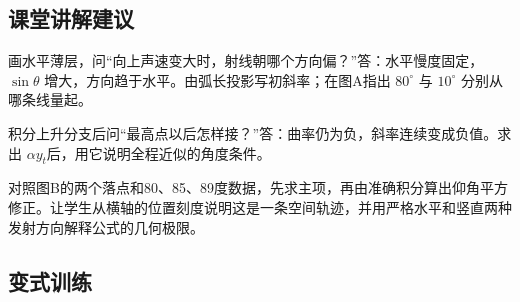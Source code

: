 \documentclass[UTF8,fontset=fandol,a4paper,11pt]{ctexart}
\begin{document}


\subsection*{课堂讲解建议}

画水平薄层，问“向上声速变大时，射线朝哪个方向偏？”答：水平慢度固定，$\sin\theta$ 增大，方向趋于水平。由弧长投影写初斜率；在图A指出 $80^\circ$ 与 $10^\circ$ 分别从哪条线量起。

积分上升分支后问“最高点以后怎样接？”答：曲率仍为负，斜率连续变成负值。求出 $\alpha y_t$后，用它说明全程近似的角度条件。

对照图B的两个落点和80、85、89度数据，先求主项，再由准确积分算出仰角平方修正。让学生从横轴的位置刻度说明这是一条空间轨迹，并用严格水平和竖直两种发射方向解释公式的几何极限。




\subsection*{变式训练}
\end{document}
